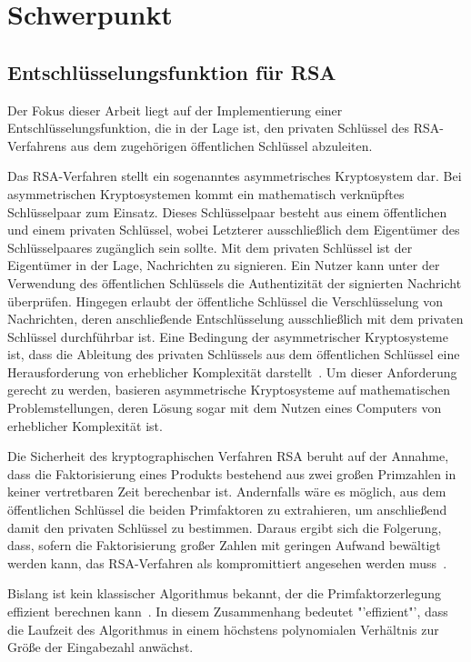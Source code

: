 \section{Schwerpunkt}
\subsection{Entschlüsselungsfunktion für RSA} 
Der Fokus dieser Arbeit liegt auf der Implementierung einer Entschlüsselungsfunktion, die in der Lage ist, 
den privaten Schlüssel des RSA-Verfahrens aus dem zugehörigen öffentlichen Schlüssel abzuleiten.

Das RSA-Verfahren stellt ein sogenanntes asymmetrisches Kryptosystem dar.
Bei asymmetrischen Kryptosystemen kommt ein mathematisch verknüpftes Schlüsselpaar zum Einsatz. 
Dieses Schlüsselpaar besteht aus einem öffentlichen und einem privaten Schlüssel, 
wobei Letzterer ausschließlich dem Eigentümer des Schlüsselpaares zugänglich sein sollte.
Mit dem privaten Schlüssel ist der Eigentümer in der Lage, Nachrichten zu signieren. 
Ein Nutzer kann unter der Verwendung des öffentlichen Schlüssels die Authentizität der signierten Nachricht überprüfen. 
Hingegen erlaubt der öffentliche Schlüssel die Verschlüsselung von Nachrichten, 
deren anschließende Entschlüsselung ausschließlich mit dem privaten Schlüssel durchführbar ist.
Eine Bedingung der asymmetrischer Kryptosysteme ist, 
dass die Ableitung des privaten Schlüssels aus dem öffentlichen Schlüssel eine Herausforderung von erheblicher Komplexität darstellt~\cite{1055638}. 
Um dieser Anforderung gerecht zu werden, basieren asymmetrische Kryptosysteme auf mathematischen Problemstellungen, 
deren Lösung sogar mit dem Nutzen eines Computers von erheblicher Komplexität ist.

Die Sicherheit des kryptographischen Verfahren RSA beruht auf der Annahme,
dass die Faktorisierung eines Produkts bestehend aus zwei großen Primzahlen in keiner vertretbaren Zeit berechenbar ist.
Andernfalls wäre es möglich, aus dem öffentlichen Schlüssel die beiden Primfaktoren zu extrahieren, 
um anschließend damit den privaten Schlüssel zu bestimmen.
Daraus ergibt sich die Folgerung, dass, sofern die Faktorisierung großer Zahlen mit geringen Aufwand bewältigt werden kann, 
das RSA-Verfahren als kompromittiert angesehen werden muss~\cite{Cormen2009}.

Bislang ist kein klassischer Algorithmus bekannt, der die Primfaktorzerlegung effizient berechnen kann~\cite{Hoever2022Krypto}.
In diesem Zusammenhang bedeutet "'effizient"', dass die Laufzeit des Algorithmus in einem höchstens polynomialen Verhältnis zur Größe der Eingabezahl anwächst.

